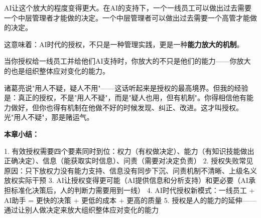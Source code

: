 AI让这个放大的程度变得更大。在AI的支持下，一个一线员工可以做出过去需要一个中层管理者才能做的决定。一个中层管理者可以做出过去需要一个高管才能做的决定。

这意味着：AI时代的授权，不只是一种管理实践，更是一种\textbf{能力放大的机制}。

当你授权给一线员工并给他们AI支持时，你放大的不只是他们的能力——你放大的也是组织整体应对变化的能力。

诸葛亮说"用人不疑，疑人不用"——这话听起来是授权的最高境界。但我的经验是：真正的授权，不是"用人不疑"，而是"疑人也用，但有机制"。你得相信他有能力做好，但你也得有机制在他做不好的时候发现、纠正、改进。这才叫授权。光"用人不疑"，那是赌运气。


\textbf{本章小结：}

1. 有效授权需要四个要素同时到位：权力（有权做决定）、能力（有知识技能做出正确决定）、信息（能获取实时信息）、问责（需要对决定负责）
2. 授权失败常见原因：只下放权力没有能力支持、信息没有同步下沉、问责机制不清晰、上级名义放权实际干预
3. AI让授权变得更可能（AI提供信息和分析支持）和更必要（AI承担标准化决策后，人的判断力需要用到一线）
4. AI时代授权新模式：一线员工 + AI助手 = 更快的决策 + 更低的成本 + 更高的质量
5. 授权是人的能力的延伸——通过让别人做决定来放大组织整体应对变化的能力
